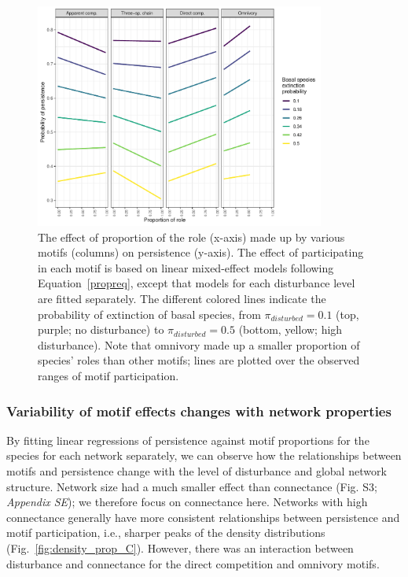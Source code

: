 \documentclass[12pt]{article}
\begin{document}
\begin{spacing}{2.0}
            
            \begin{figure}[h!]
                \centering
                \includegraphics[width=0.85\textwidth]{figures/prop_lmer_allCS.pdf}
                \caption{The effect of proportion of the role (x-axis) made up by various motifs (columns) on persistence (y-axis). The effect of participating in each motif is based on linear mixed-effect models following Equation~\ref{propreq}, except that models for each  disturbance level are fitted separately. The different colored lines indicate the probability of extinction of basal species, from $\pi_{disturbed} = 0.1$ (top, purple; no disturbance) to $\pi_{disturbed} = 0.5$ (bottom, yellow; high disturbance). Note that omnivory made up a smaller proportion of species' roles than other motifs; lines are plotted over the observed ranges of motif participation.}
                \label{fig:prop_lmer_all}
            \end{figure}
        
        \clearpage
    
        \subsubsection*{Variability of motif effects changes with network properties}

            By fitting linear regressions of persistence against motif proportions for the species for each network separately, we can observe how the relationships between motifs and persistence change with the level of disturbance and global network structure. Network size had a much smaller effect than connectance (Fig. S3; \emph{Appendix SE}); we therefore focus on connectance here. 
            Networks with high connectance generally have more consistent relationships between persistence and motif participation, i.e., sharper peaks of the density distributions (Fig.~\ref{fig:density_prop_C}). 
            However, there was an interaction between disturbance and connectance for the direct competition and omnivory motifs.
            

\end{spacing}
\end{document}
